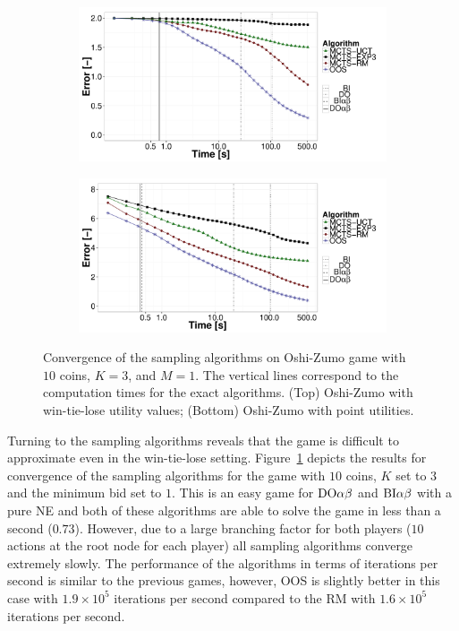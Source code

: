 \begin{figure}[t!]
\centering
	\begin{subfigure}{0.85\textwidth}
		\includegraphics[width=1\textwidth]{figures/convergence-oz.pdf}
	\end{subfigure}
	\begin{subfigure}{0.85\textwidth}
		\includegraphics[width=1\textwidth]{figures/convergence-oz-bf.pdf}
	\end{subfigure}
\caption{Convergence of the sampling algorithms on Oshi-Zumo game with $10$ coins, $K=3$, and $M=1$. The vertical lines correspond to the computation times for the exact algorithms.
(Top) Oshi-Zumo with win-tie-lose utility values;
(Bottom) Oshi-Zumo with point utilities.} \label{fig:off:conv:oz}
\end{figure}

Turning to the sampling algorithms reveals that the game is difficult to approximate even in the win-tie-lose setting.
Figure~\ref{fig:off:conv:oz} depicts the results for convergence of the sampling algorithms for the game with $10$ coins, $K$ set to $3$ and the minimum bid set to $1$. This is an easy game for $\textrm{DO}\alpha\beta$ and $\textrm{BI}\alpha\beta$ with a pure NE and both of these algorithms are able to solve the game in less than a second ($0.73$). However, due to a large branching factor for both players ($10$ actions at the root node for each player) all sampling algorithms converge extremely slowly. The performance of the algorithms in terms of iterations per second is similar to the previous games, however, OOS is slightly better in this case with $1.9\times10^5$ iterations per second compared to the RM with $1.6\times10^5$ iterations per second.


